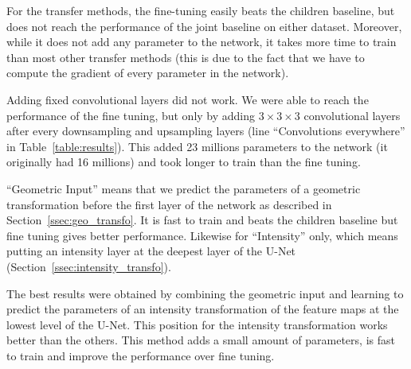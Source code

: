 

For the transfer methods, the fine-tuning easily beats the children baseline, but does not reach the performance of the joint baseline on either dataset. Moreover, while it does not add any parameter to the network, it takes more time to train than most other transfer methods (this is due to the fact that we have to compute the gradient of every parameter in the network).

Adding fixed convolutional layers did not work. We were able to reach the performance of the fine tuning, but only by adding $3 \times 3 \times 3$ convolutional layers after every downsampling and upsampling layers (line  ``Convolutions everywhere'' in Table~\ref{table:results}). This added 23 millions parameters to the network (it originally had 16 millions) and took longer to train than the fine tuning.

``Geometric Input'' means that we predict the parameters of a geometric transformation before the first layer of the network as described in Section~\ref{ssec:geo_transfo}. It is fast to train and beats the children baseline but fine tuning gives better performance. Likewise for ``Intensity'' only, which means putting an intensity layer at the deepest layer of the U-Net (Section~\ref{ssec:intensity_transfo}).

The best results were obtained by combining the geometric input and learning to predict the parameters of an intensity transformation of the feature maps at the lowest level of the U-Net. This position for the intensity transformation works better than the others. This method adds a small amount of parameters, is fast to train and improve the performance over fine tuning.

